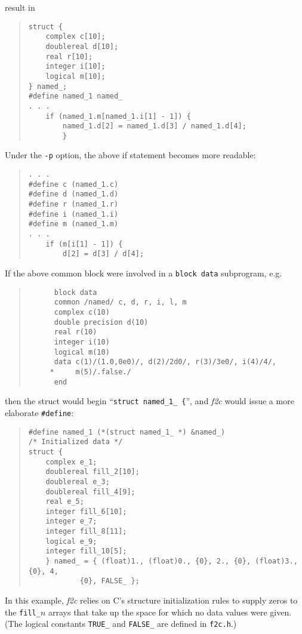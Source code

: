 \documentclass[12pt]{article}
\begin{document}
result in
\begin{quote}
\begin{verbatim}
struct {
    complex c[10];
    doublereal d[10];
    real r[10];
    integer i[10];
    logical m[10];
} named_;
#define named_1 named_
. . .
    if (named_1.m[named_1.i[1] - 1]) {
        named_1.d[2] = named_1.d[3] / named_1.d[4];
        }
\end{verbatim}
\end{quote}
Under the \verb|-p| option, the above if statement becomes more readable:
\begin{quote}
\begin{verbatim}
. . .
#define c (named_1.c)
#define d (named_1.d)
#define r (named_1.r)
#define i (named_1.i)
#define m (named_1.m)
. . .
    if (m[i[1] - 1]) {
        d[2] = d[3] / d[4];
\end{verbatim}
\end{quote}
If the above common block were involved in a \verb|block data| subprogram, e.g.
\begin{quote}
\begin{verbatim}
      block data
      common /named/ c, d, r, i, l, m
      complex c(10)
      double precision d(10)
      real r(10)
      integer i(10)
      logical m(10)
      data c(1)/(1.0,0e0)/, d(2)/2d0/, r(3)/3e0/, i(4)/4/,
     *     m(5)/.false./
      end
\end{verbatim}
\end{quote}
then the struct would begin ``\verb|struct named_1_ {|'', and \emph{f2c} would issue a more elaborate
\verb|#define|:
\begin{quote}
\begin{verbatim}
#define named_1 (*(struct named_1_ *) &named_)
/* Initialized data */
struct {
    complex e_1;
    doublereal fill_2[10];
    doublereal e_3;
    doublereal fill_4[9];
    real e_5;
    integer fill_6[10];
    integer e_7;
    integer fill_8[11];
    logical e_9;
    integer fill_10[5];
    } named_ = { (float)1., (float)0., {0}, 2., {0}, (float)3., {0}, 4,
            {0}, FALSE_ };
\end{verbatim}
\end{quote}
In this example, \emph{f2c} relies on C’s structure initialization rules to supply zeros to the \verb|fill_|$n$ arrays that take up the space for which no data values were given. (The logical constants \verb|TRUE_| and \verb|FALSE_| are defined in \verb|f2c.h|.)
\end{document}
